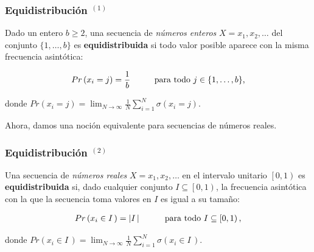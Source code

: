 \documentclass[t, 10pt, mathserif]{beamer}
\begin{document}

\begin{frame}
  \frametitle{Equidistribución {$^{(1)}$}}

  Dado un entero $b \ge 2$, una secuencia de \textit{números enteros} $X = x_1, x_2, \dots$ del conjunto $\{ 1, \dots, b \}$ es \textbf{equidistribuida} si todo valor posible aparece con la misma frecuencia asintótica:
  \pause

  \begin{equation*}
    \begin{aligned}
      Pr \left( x_i = j \right) = \frac{1}{b} \hspace*{1cm} \text{para todo } j \in \{ 1, \dots, b \} \text{,}
    \end{aligned}
  \end{equation*}
  \pause

  \vspace{-0.5cm}
  donde $\displaystyle Pr(x_i = j) = \lim_{N \to \infty} \frac{1}{N} \sum_{i = 1}^{N} \sigma(x_i = j)$.
  \pause

  Ahora, damos una noción equivalente para secuencias de números reales.
\end{frame}


\begin{frame}
  \frametitle{Equidistribución {$^{(2)}$}}

  Una secuencia de \textit{números reales} $X = x_1, x_2, \dots$ en el intervalo unitario $\left[0, 1\right)$ es \textbf{equidistribuida} si, dado cualquier conjunto $I \subseteq \left[0, 1\right)$, la frecuencia asintótica con la que la secuencia toma valores en $I$ es igual a su tamaño:
  \pause

  \begin{equation*}
    \begin{aligned}
      Pr \left( x_i \in I\, \right) = \left| I\, \right| \hspace*{1cm} \text{para todo } I \subseteq \left[0, 1\right) \text{,}
    \end{aligned}
  \end{equation*}
  \pause

  \vspace{-0.5cm}
  donde $\displaystyle Pr \left( x_i \in I\, \right) = \lim_{N \to \infty} \frac{1}{N} \sum_{i = 1}^{N} \sigma(x_i \in I\,)$.
  \pause

\end{frame}
\end{document}
